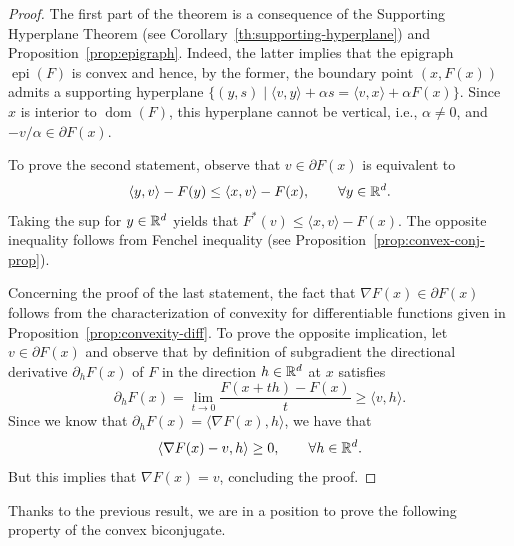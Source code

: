  \begin{proof}
     The first part of the theorem is a consequence of the Supporting Hyperplane Theorem (see Corollary~\ref{th:supporting-hyperplane}) and Proposition~\ref{prop:epigraph}. Indeed, the latter implies that the epigraph $\operatorname{epi}(F)$ is convex and hence, by the former, the boundary point $(x,F(x))$ admits a supporting hyperplane $\{(y,s)\mid \langle v,y\rangle + \alpha s = \langle v,x\rangle +\alpha F(x)\}$. Since $x$ is interior to $\operatorname{dom}(F)$, this hyperplane cannot be vertical, i.e., $\alpha\neq 0$, and $-v/\alpha\in\partial F(x)$.
 
     To prove the second statement, observe that $v\in\partial F(x)$ is equivalent to
     \begin{equation}
         \langle y,v\rangle - F(y) \le \langle x,v\rangle-F(x), \qquad \forall y\in\mathbb{R}^d.
     \end{equation}
     Taking the sup for $y\in\mathbb{R}^d$ yields that $F^*(v)\le \langle x,v\rangle -F(x)$. The opposite inequality follows from Fenchel inequality (see Proposition~\ref{prop:convex-conj-prop}).
 
     Concerning the proof of the last statement, the fact that $\nabla F(x)\in \partial F(x)$ follows from the characterization of convexity for differentiable functions given in Proposition~\ref{prop:convexity-diff}.
     To prove the opposite implication, let $v\in \partial F(x)$ and observe that by definition of subgradient the directional derivative $\partial_h F(x)$ of $F$ in the direction $h\in\mathbb{R}^d$ at $x$ satisfies
     \begin{equation}
         \partial_h F(x) = \lim_{t\to 0} \frac{F(x+th)-F(x)}{t} \ge \langle v, h\rangle.
     \end{equation}
     Since we know that $\partial_hF (x)=\langle \nabla F(x),h\rangle$, we have that
     \begin{equation}
         \langle \nabla F(x) - v,h\rangle \ge 0, \qquad \forall h\in\mathbb{R}^d.
     \end{equation}
     But this implies that $\nabla F(x)=v$, concluding the proof.
 \end{proof}
 
 
 
 Thanks to the previous result, we are in a position to prove the following property of the convex biconjugate.
 
 
